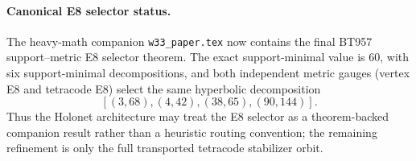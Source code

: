 
\paragraph{Canonical E8 selector status.}
The heavy-math companion \texttt{w33\_paper.tex} now contains the final
BT957 support--metric E8 selector theorem.  The exact support-minimal value is
60, with six support-minimal decompositions, and both independent metric gauges
(vertex E8 and tetracode E8) select the same hyperbolic decomposition
\[
  [(3,68),(4,42),(38,65),(90,144)].
\]
Thus the Holonet architecture may treat the E8 selector as a theorem-backed
companion result rather than a heuristic routing convention; the remaining
refinement is only the full transported tetracode stabilizer orbit.
